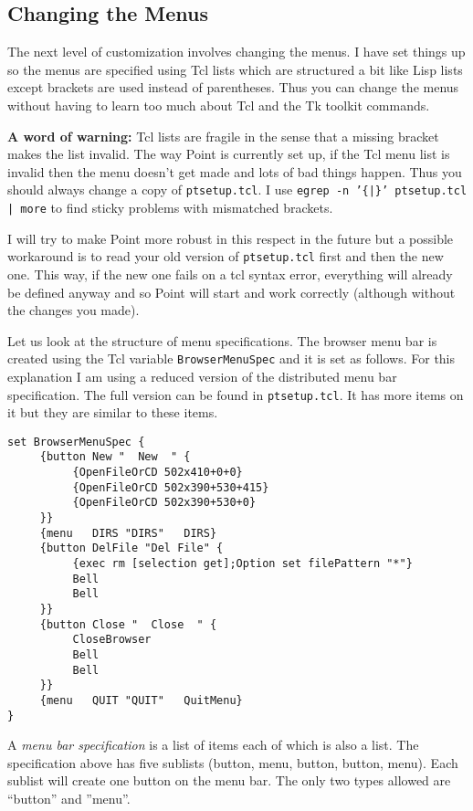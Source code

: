 \subsection{ Changing the Menus }

The next level of customization involves changing the menus.
I have set things up so the menus are specified using Tcl
lists which are structured a bit like Lisp lists except brackets
are used instead of parentheses.
Thus you can change the menus without having to learn too much about Tcl
and the Tk toolkit commands.

{\bf A word of warning:} Tcl lists are fragile in the sense that a missing
bracket makes the list invalid.
The way Point is currently set up, if the Tcl menu list is invalid
then the menu doesn't get made and lots of bad things happen.
Thus you should always change a copy of {\tt ptsetup.tcl}.
I use {\tt egrep -n '\{|\}' ptsetup.tcl | more} to find sticky
problems with mismatched brackets.

I will try to make Point more robust in this respect in the future
but a possible workaround is to read your old version of
{\tt ptsetup.tcl} first and then the new one.
This way, if the new one fails on a tcl syntax error, everything
will already be defined anyway and so Point will start and work
correctly (although without the changes you made).

Let us look at the structure of menu specifications.
The browser menu bar is created using the Tcl variable {\tt BrowserMenuSpec}
and it is set as follows.
For this explanation I am using a reduced version of the 
distributed menu bar specification.
The full version can be found in {\tt ptsetup.tcl}.
It has more items on it but they are similar to these items.

\begin{verbatim}
set BrowserMenuSpec {
     {button New "  New  " {
          {OpenFileOrCD 502x410+0+0}
          {OpenFileOrCD 502x390+530+415}
          {OpenFileOrCD 502x390+530+0}
     }}
     {menu   DIRS "DIRS"   DIRS}
     {button DelFile "Del File" {
          {exec rm [selection get];Option set filePattern "*"}
          Bell
          Bell
     }}
     {button Close "  Close  " {
          CloseBrowser
          Bell
          Bell
     }}
     {menu   QUIT "QUIT"   QuitMenu}
}
\end{verbatim}

A {\it menu bar specification} is a list of items each of which is
also a list.
The specification above has five sublists
(button, menu, button, button, menu).
Each sublist will create one button on the menu bar.
The only two types allowed are ``button'' and ''menu''.

